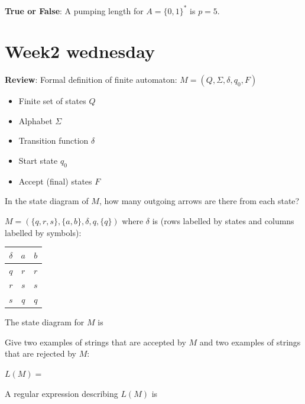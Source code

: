 \documentclass[12pt, oneside]{article}
\begin{document}
{\bf True or False}: A pumping length for $A = \{ 0,1 \}^*$ is $p = 5$.

\vspace{50pt} \vfill
\section*{Week2 wednesday}



{\bf Review}: Formal definition of finite automaton: $M = (Q, \Sigma, \delta, q_0, F)$ 

\begin{center}
\begin{multicols}{2}
\begin{itemize}
\setlength{\itemsep}{2pt}
\item Finite set of states $Q$
\item Alphabet $\Sigma$
\item Transition function $\delta$
\item Start state $q_0$
\item Accept (final) states $F$
\end{itemize}
\end{multicols}
\end{center}
In the state diagram of $M$, how many outgoing arrows are there from each state?

$M = ( \{ q, r, s\}, \{a,b\}, \delta, q, \{q\} )$ 
where $\delta$ is  (rows labelled by states
and columns labelled by symbols):
\begin{center}
\begin{tabular}{c|cc}
$\delta$ & $a$ & $b$ \\
\hline
$q$ & $r$ & $r$ \\
$r$ & $s$ & $s$ \\
$s$ & $q$ & $q$ \\
\end{tabular}
\end{center}

The state diagram for $M$ is 

\vfill



Give two examples of strings that are accepted by $M$ and two examples of strings that are rejected by $M$:

\vfill



$L(M) = $

A regular expression describing $L(M)$ is
\end{document}
